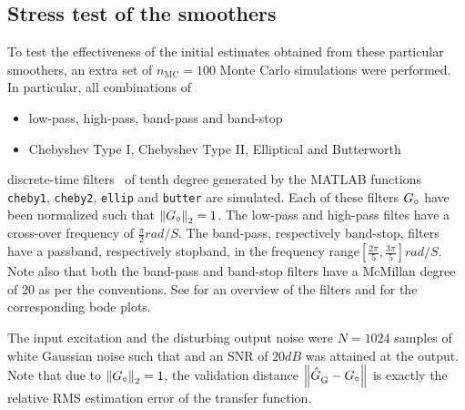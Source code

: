 \subsection{Stress test of the smoothers}
To test the effectiveness of the initial estimates obtained from these particular smoothers, an extra set of $n_{\mathrm{MC}} = 100$ Monte Carlo simulations were performed.
In particular, all combinations of
\begin{itemize}
  \item low-pass, high-pass, band-pass and band-stop 
  \item Chebyshev Type I, Chebyshev Type II, Elliptical and Butterworth
\end{itemize}
discrete-time filters~\citep{Zverev1967} of tenth degree generated by the MATLAB functions \texttt{cheby1}, \texttt{cheby2}, \texttt{ellip} and \texttt{butter} are simulated.
Each of these filters $\true{G}$ have been normalized such that $\norm[2]{\true{G}} = 1$.
The low-pass and high-pass filtes have a cross-over frequency of $\frac{\pi}{2} \unit{rad/S}$. 
The band-pass, respectively band-stop, filters have a passband, respectively stopband, in the frequency range$\left[ \frac{2\pi}{5}, \frac{3\pi}{5}\right] \unit{rad/S}$.
Note also that both the band-pass and band-stop filters have a McMillan degree of 20 as per the \MATLAB conventions.
See  for an overview of the filters and   for the corresponding bode plots.

The input excitation and the disturbing output noise were $N=1024$ samples of white Gaussian noise such that and an SNR of $20 \unit{dB}$ was attained at the output.
Note that due to $\norm[2]{\true{G}}=1$, the validation distance $\norm{\model{G} - \true{G}}$ is exactly the relative \gls{RMS} estimation error of the transfer function.

